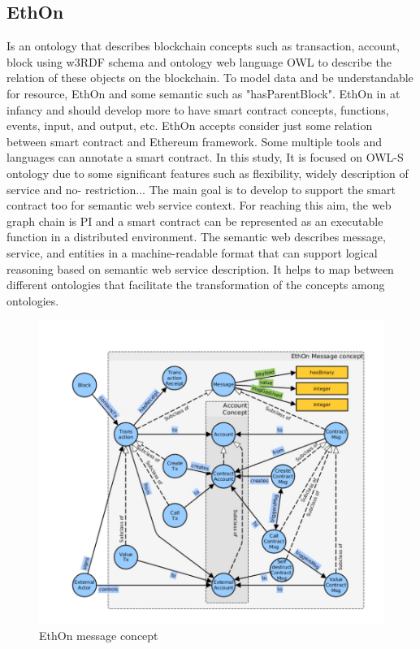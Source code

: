 \subsection{EthOn}
Is an ontology that describes blockchain concepts such as transaction, account, block using w3RDF
schema and ontology web language OWL to describe the relation of these objects on the blockchain.
To model data and be understandable for resource, EthOn and some semantic such as "hasParentBlock".
EthOn in at infancy and should develop more to have smart contract concepts, functions, events, input, and output, etc.
EthOn accepts consider just some relation between smart contract and Ethereum framework. Some multiple tools and languages can annotate a smart contract. In this study, It is focused on OWL-S ontology due to some significant features such as flexibility, widely description of service and no- restriction... 
The main goal is to develop to support the smart contract too for semantic web service context.
For reaching this aim, the web graph chain is PI and a smart contract can be represented as an executable function in a distributed environment. The semantic web describes message, service, and entities in a machine-readable format that can support logical reasoning based on semantic web service description. It helps to map between different ontologies that facilitate the transformation of the concepts among ontologies\cite{Baqa}. 

\begin{center}
	\begin{figure}[htb!]
		
		\begin{minipage}{0.55\linewidth}
			\centering
			\includegraphics[width=1.65\textwidth]{images/chap02_EthOn.jpg}
		\end{minipage}
		\caption[EthOn message concept]{EthOn message concept\cite{Baqa}}
		
	\end{figure}
	
\end{center}



